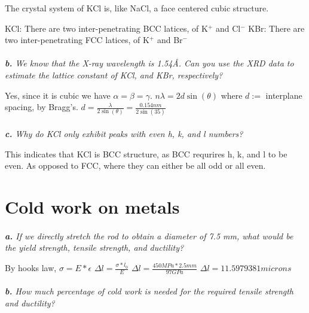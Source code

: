 \documentclass[letterpaper]{article}
\begin{document}
The crystal system of KCl is, like NaCl, a face centered cubic structure.

KCl: There are two inter-penetrating BCC latices, of K$^{+}$ and Cl$^{-}$
KBr: There are two inter-penetrating FCC latices, of K$^{+}$ and Br$^{-}$
    
    \paragraph{}
    \textit{
        \textbf{b.} 
        We know that the X-ray wavelength is 1.54\AA. Can you use the XRD data to estimate the lattice constant of KCl, and KBr, respectively?
        }
    
    Yes, since it is cubic we have $\alpha = \beta = \gamma$. $n\lambda = 2d\sin{(\theta)}$ where $d :=$ interplane spacing, by Bragg's.
    $d = \frac{\lambda}{2\sin{(\theta)}} = \frac{0.154 nm}{2\sin{(35)}}$


    \paragraph{}
    \paragraph{}
    \textit{
        \textbf{c.} 
        Why do KCl only exhibit peaks with even h, k, and l numbers?
        }
        
    This indicates that KCl is BCC structure, as BCC requrires h, k, and l to be even.
    As opposed to FCC, where they can either be all odd or all even.

\section{Cold work on metals}
    \paragraph{}
    \textit{
        \textbf{a.} 
        If we directly stretch the rod to obtain a diameter of 7.5 mm, what would be the yield strength, tensile strength, and ductility? 
        }

        By hooks law, $\sigma = E * \epsilon$
        $\Delta{l} = \frac{\sigma * l_{0}}{E}$
        $\Delta{l} = \frac{450 MPa * 2.5 mm }{97 GPa}$
        $\Delta{l} = 11.5979381 microns$
        
    \paragraph{}
    \textit{
        \textbf{b.} 
        How much percentage of cold work is needed for the required tensile strength and ductility?
        }
\end{document}
